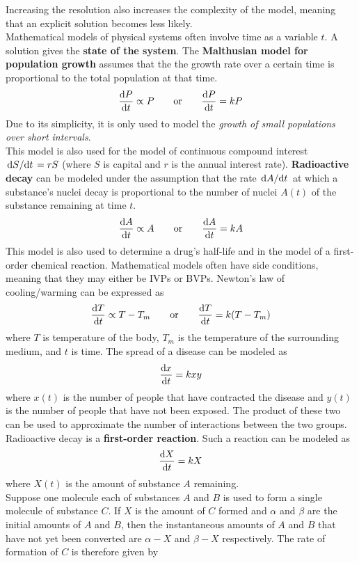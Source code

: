 \documentclass[../Differential Equations.tex]{subfiles}
\begin{document}
			Increasing the resolution also increases the complexity of the model, meaning that an explicit solution becomes less likely. \\
			Mathematical models of physical systems often involve time as a variable \(t\). A solution gives the \textbf{state of the system}.
			The \textbf{Malthusian model for population growth} assumes that the the growth rate over a certain time is proportional to the total population at that time.
				\[\dv{P}{t} \propto P \qquad \text{or} \qquad \dv{P}{t} = kP\]
				Due to its simplicity, it is only used to model the \textit{growth of small populations over short intervals}. \\
				This model is also used for the model of continuous compound interest \(\dv*{S}{t} = rS\) (where \(S\) is capital and \(r\) is the annual interest rate).
			\textbf{Radioactive decay} can be modeled under the assumption that the rate \(\dv*{A}{t}\) at which a substance's nuclei decay is proportional to the number of nuclei \(A(t)\) of the substance remaining at time \(t\).
				\[\dv{A}{t} \propto A \qquad \text{or} \qquad \dv{A}{t} = kA\]
			This model is also used to determine a drug's half-life and in the model of a first-order chemical reaction.
			Mathematical models often have side conditions, meaning that they may either be IVPs or BVPs.
			Newton's law of cooling/warming can be expressed as 
				\[\dv{T}{t} \propto T - T_m \qquad \text{or} \qquad \dv{T}{t} = k(T - T_m)\]
				where \(T\) is temperature of the body, \(T_m\) is the temperature of the surrounding medium, and \(t\) is time.
			The spread of a disease can be modeled as
				\[\dv{x}{t} = kxy\]
				where \(x(t)\) is the number of people that have contracted the disease and \(y(t)\) is the number of people that have not been exposed. The product of these two can be used to approximate the number of interactions between the two groups.
			Radioactive decay is a \textbf{first-order reaction}. Such a reaction can be modeled as
				\[\dv{X}{t} = kX\]
				where \(X(t)\) is the amount of substance \(A\) remaining. \\
			Suppose one molecule each of substances \(A\) and \(B\) is used to form a single molecule of substance \(C\). If \(X\) is the amount of \(C\) formed and \(\alpha\) and \(\beta\) are the initial amounts of \(A\) and \(B\), then the instantaneous amounts of \(A\) and \(B\) that have not yet been converted are \(\alpha - X\) and \(\beta - X\) respectively. The rate of formation of \(C\) is therefore given by
\end{document}
